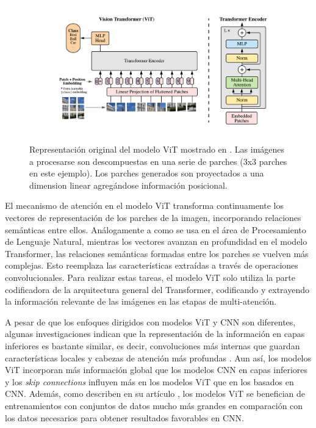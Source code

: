 \begin{figure}[htp]
    \centering
    {\includegraphics[width=1.0\textwidth]{Chapters/4. ViT-Lung/images/ViT.png}}
\caption{Representación original del modelo ViT mostrado en \cite{DBLP:journals/corr/abs-2010-11929}.
Las imágenes a procesarse son descompuestas en una serie de parches (3x3 parches en este ejemplo). Los
parches generados son proyectados a una dimension linear agregándose información posicional.}
\label{fig_ViT}
\end{figure}

El mecanismo de atención en el modelo ViT transforma continuamente los vectores de representación de
los parches de la imagen, incorporando relaciones semánticas entre ellos. Análogamente a como se usa
en el área de Procesamiento de Lenguaje Natural, mientras los vectores avanzan en profundidad en el
modelo Transformer, las relaciones semánticas formadas entre los parches se vuelven más complejas.
Esto reemplaza las características extraídas a través de operaciones convolucionales. Para realizar
estas tareas, el modelo ViT solo utiliza la parte codificadora de la arquitectura general del Transformer,
codificando y extrayendo la información relevante de las imágenes en las etapas de multi-atención.

A pesar de que los enfoques dirigidos con modelos ViT y CNN son diferentes, algunas investigaciones
indican que la representación de la información en capas inferiores es bastante similar, es decir,
convoluciones más internas que guardan características locales y cabezas de atención más profundas
\cite{DBLP:journals/corr/abs-2108-08810}. Aun así, los modelos ViT incorporan más información global
que los modelos CNN en capas inferiores y los \textit{skip connections} influyen más en los modelos
ViT que en los basados en CNN. Además, como describen en su artículo \citeauthor{DBLP:journals/corr/abs-2010-11929},
los modelos ViT se benefician de entrenamientos con conjuntos de datos mucho más grandes en comparación
con los datos necesarios para obtener resultados favorables en CNN.

